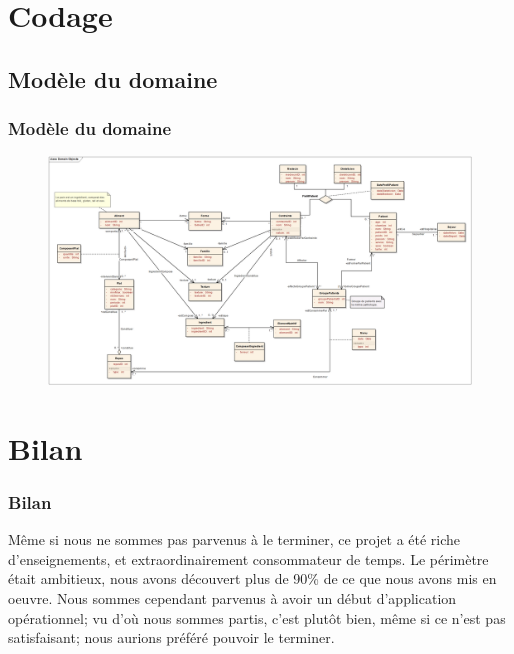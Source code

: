 \documentclass{beamer}
\begin{document}
\section{Codage}
\subsection{Modèle du domaine}
\begin{frame}[label=MDD]
  \frametitle{Modèle du domaine}
  \begin{figure}
    \centering
    \includegraphics[scale=0.12]{../ModeleDuDomaine/ModeleDuDomaine.png}
  \end{figure}
\end{frame}

\section{Bilan}
\begin{frame}[label=Bilan]
  \frametitle{Bilan}
  \rightskip=0pt\leftskip=0pt
  Même si nous ne sommes pas parvenus à le terminer, ce projet a été riche d'enseignements, et extraordinairement consommateur de temps.
Le périmètre était ambitieux, nous avons découvert plus de 90\% de ce que nous avons mis en oeuvre. Nous sommes cependant parvenus à avoir un début d'application opérationnel; vu d'où nous sommes partis, c'est plutôt bien, même si ce n'est pas satisfaisant; nous aurions préféré pouvoir le terminer.

\end{frame}
\end{document}
